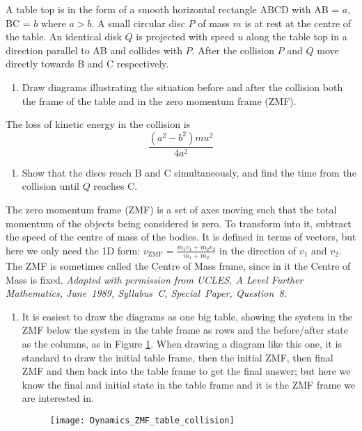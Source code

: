 \begin{hint}[Discs on a Table]%
{A table top is in the form of a smooth horizontal rectangle ABCD with AB = $a$, BC = $b$ where $a>b$. A small circular disc $P$ of mass $m$ is at rest at the centre of the table. An identical disk $Q$ is projected with speed $u$ along the table top in a direction parallel to AB and collides with $P$. After the collision $P$ and $Q$ move directly towards B and C respectively.
\begin{enumerate}
	\item Draw diagrams illustrating the situation before and after the collision both the frame of the table and in the zero momentum frame (ZMF).
\end{enumerate}
The loss of kinetic energy in the collision is \begin{equation*} \frac{(a^{2} - b^{2}) mu^{2}}{4a^{2}} \end{equation*}
\begin{enumerate}[resume]
	\item Show that the discs reach B and C simultaneously, and find the time from the collision until $Q$ reaches C.
	
\end{enumerate}
}
{The zero momentum frame (ZMF) is a set of axes moving such that the total momentum of the objects being considered is zero. To transform into it, subtract the speed of the centre of mass of the bodies. It is defined in terms of vectors, but here we only need the 1D form:  $v_{\textrm{ZMF}} = \frac{m_{1}v_{1} + m_{2}v_{2}}{m_{1} + m_{2}}$ in the direction of $v_{1}$ and $v_{2}$. The ZMF is sometimes called the Centre of Mass frame, since in it the Centre of Mass is fixed.}
{\textit{Adapted with permission from UCLES, A Level Further Mathematics, June~1989, Syllabus~C, Special~Paper, Question~8.}}
{\begin{enumerate}
	\item It is easiest to draw the diagrams as one big table, showing the system in the ZMF below the system in the table frame as rows and the before/after state as the columns, as in Figure \ref{fig:Dynamics_ZMF_table_collision}. When drawing a diagram like this one, it is standard to draw the initial table frame, then the initial ZMF, then final ZMF and then back into the table frame to get the final answer; but here we know the final and initial state in the table frame and it is the ZMF frame we are interested in.
\begin{figure}[h]
\centering
\texttt{[image: Dynamics\_ZMF\_table\_collision]}
\caption{}
\label{fig:Dynamics_ZMF_table_collision}
\end{figure}


\end{enumerate}}
\end{hint}
